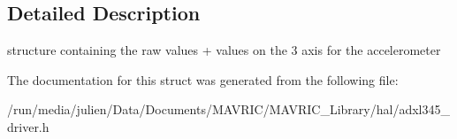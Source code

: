 \subsection{Detailed Description}
structure containing the raw values + values on the 3 axis for the accelerometer 

The documentation for this struct was generated from the following file\+:\begin{DoxyCompactItemize}
\item 
/run/media/julien/\+Data/\+Documents/\+M\+A\+V\+R\+I\+C/\+M\+A\+V\+R\+I\+C\+\_\+\+Library/hal/adxl345\+\_\+driver.\+h\end{DoxyCompactItemize}
